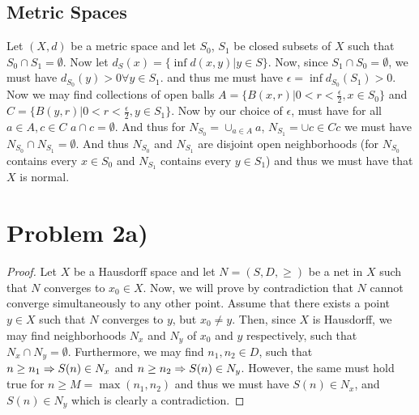 \subsection*{Metric Spaces}
Let $(X,d)$ be a metric space and let $S_0$, $S_1$ be closed subsets of $X$ such that $S_0\cap S_1 =\emptyset$. Now let $d_S(x) = \{ \inf d(x,y) | y\in S\}$. Now, since $S_1\cap S_0=\emptyset$, we must have $d_{S_0}(y)>0 \forall y\in S_1$. and thus me must have $\epsilon = \inf d_{S_0}(S_1)>0$. Now we may find collections of open balls $A=\{B(x,r)| 0<r<\frac{\epsilon}{2}, x\in S_0 \}$ and $C = \{B(y,r)| 0<r<\frac{\epsilon}{2}, y\in S_1 \}$. Now by our choice of $\epsilon$, must have for all $a\in A, c\in C$ $a\cap c=\emptyset$. And thus for $N_{S_0}=\cup_{a\in A} a$, $N_{S_1} = \cup{c\in C} c$ we must have $N_{S_0}\cap N_{S_1} = \emptyset$. And thus $N_{S_0}$ and $N_{S_1}$ are disjoint open neighborhoods (for $N_{S_0}$ contains every $x\in S_0$ and $N_{S_1}$ contains every $y\in S_1$) and thus we must have that $X$ is normal.


\section*{Problem 2a)}
\begin{proof}
Let $X$ be a Hausdorff space and let $N=(S,D,\geq)$ be a net in $X$ such that $N$ converges to $x_0 \in X$. Now, we will prove by contradiction that $N$ cannot converge simultaneously to any other point. Assume that there exists a point $y\in X$ such that $N$ converges to $y$, but $x_0\neq y$. Then, since $X$ is Hausdorff, we may find neighborhoods $N_x$ and $N_y$ of $x_0$ and $y$ respectively, such that $N_x \cap N_y = \emptyset$. Furthermore, we may find $n_1,n_2 \in D$, such that $n\geq n_1 \Rightarrow S(n) \in N_x$ and $n\geq n_2 \Rightarrow S(n) \in N_y$. However, the same must hold true for $n\geq M=\max(n_1,n_2)$ and thus we must have $S(n) \in N_x$, and $S(n) \in N_y$ which is clearly a contradiction. 
\end{proof}

